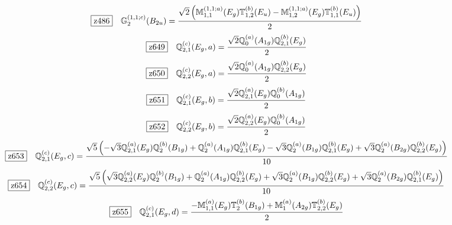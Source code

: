 \documentclass[fleqn,10pt,landscape]{jsarticle}
\begin{document}
\begin{dmath*}
\hspace*{3mm}\fbox{z486}\quad \mathbb{G}_{2}^{(1,1;c)}(B_{2u})=\frac{\sqrt{2} \left(\mathbb{M}_{1,1}^{(1,1;a)}(E_{g}) \mathbb{T}_{1,2}^{(b)}(E_{u}) - \mathbb{M}_{1,2}^{(1,1;a)}(E_{g}) \mathbb{T}_{1,1}^{(b)}(E_{u})\right)}{2}
\end{dmath*}
\begin{dmath*}
\hspace*{3mm}\fbox{z649}\quad \mathbb{Q}_{2,1}^{(c)}(E_{g},a)=\frac{\sqrt{2} \mathbb{Q}_{0}^{(a)}(A_{1g}) \mathbb{Q}_{2,1}^{(b)}(E_{g})}{2}
\end{dmath*}
\begin{dmath*}
\hspace*{3mm}\fbox{z650}\quad \mathbb{Q}_{2,2}^{(c)}(E_{g},a)=\frac{\sqrt{2} \mathbb{Q}_{0}^{(a)}(A_{1g}) \mathbb{Q}_{2,2}^{(b)}(E_{g})}{2}
\end{dmath*}
\begin{dmath*}
\hspace*{3mm}\fbox{z651}\quad \mathbb{Q}_{2,1}^{(c)}(E_{g},b)=\frac{\sqrt{2} \mathbb{Q}_{2,1}^{(a)}(E_{g}) \mathbb{Q}_{0}^{(b)}(A_{1g})}{2}
\end{dmath*}
\begin{dmath*}
\hspace*{3mm}\fbox{z652}\quad \mathbb{Q}_{2,2}^{(c)}(E_{g},b)=\frac{\sqrt{2} \mathbb{Q}_{2,2}^{(a)}(E_{g}) \mathbb{Q}_{0}^{(b)}(A_{1g})}{2}
\end{dmath*}
\begin{dmath*}
\hspace*{3mm}\fbox{z653}\quad \mathbb{Q}_{2,1}^{(c)}(E_{g},c)=\frac{\sqrt{5} \left(- \sqrt{3} \mathbb{Q}_{2,1}^{(a)}(E_{g}) \mathbb{Q}_{2}^{(b)}(B_{1g}) + \mathbb{Q}_{2}^{(a)}(A_{1g}) \mathbb{Q}_{2,1}^{(b)}(E_{g}) - \sqrt{3} \mathbb{Q}_{2}^{(a)}(B_{1g}) \mathbb{Q}_{2,1}^{(b)}(E_{g}) + \sqrt{3} \mathbb{Q}_{2}^{(a)}(B_{2g}) \mathbb{Q}_{2,2}^{(b)}(E_{g})\right)}{10}
\end{dmath*}
\begin{dmath*}
\hspace*{3mm}\fbox{z654}\quad \mathbb{Q}_{2,2}^{(c)}(E_{g},c)=\frac{\sqrt{5} \left(\sqrt{3} \mathbb{Q}_{2,2}^{(a)}(E_{g}) \mathbb{Q}_{2}^{(b)}(B_{1g}) + \mathbb{Q}_{2}^{(a)}(A_{1g}) \mathbb{Q}_{2,2}^{(b)}(E_{g}) + \sqrt{3} \mathbb{Q}_{2}^{(a)}(B_{1g}) \mathbb{Q}_{2,2}^{(b)}(E_{g}) + \sqrt{3} \mathbb{Q}_{2}^{(a)}(B_{2g}) \mathbb{Q}_{2,1}^{(b)}(E_{g})\right)}{10}
\end{dmath*}
\begin{dmath*}
\hspace*{3mm}\fbox{z655}\quad \mathbb{Q}_{2,1}^{(c)}(E_{g},d)=\frac{- \mathbb{M}_{1,1}^{(a)}(E_{g}) \mathbb{T}_{2}^{(b)}(B_{1g}) + \mathbb{M}_{1}^{(a)}(A_{2g}) \mathbb{T}_{2,2}^{(b)}(E_{g})}{2}
\end{dmath*}
\end{document}
